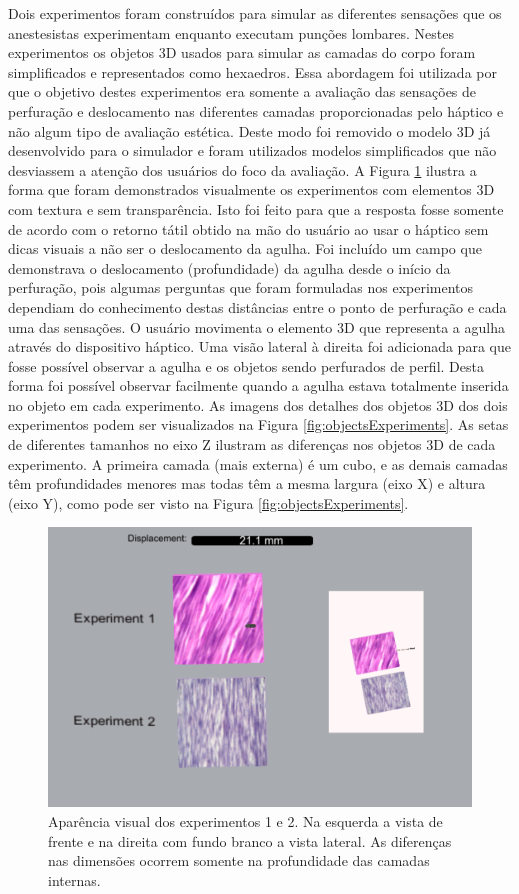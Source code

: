 Dois experimentos foram construídos para simular as diferentes sensações que os anestesistas experimentam enquanto executam punções lombares. Nestes experimentos os objetos 3D usados para simular as camadas do corpo foram simplificados e representados como hexaedros. Essa abordagem foi utilizada por que o objetivo destes experimentos era somente a avaliação das sensações de perfuração e deslocamento nas diferentes camadas proporcionadas pelo háptico e não algum tipo de avaliação estética. Deste modo foi removido o modelo 3D já desenvolvido para o simulador e foram utilizados modelos simplificados que não desviassem a atenção dos usuários do foco da avaliação. 
A Figura \ref{fig:visualExperimentos1e2} ilustra a forma que foram demonstrados visualmente os experimentos com elementos 3D com textura e sem transparência. Isto foi feito para que a resposta fosse somente de acordo com o retorno tátil obtido na mão do usuário ao usar o háptico sem dicas visuais a não ser o deslocamento da agulha. Foi incluído um campo que demonstrava o deslocamento (profundidade) da agulha desde o início da perfuração, pois algumas perguntas que foram formuladas nos experimentos dependiam do conhecimento destas distâncias entre o ponto de perfuração e cada uma das sensações. O usuário movimenta o elemento 3D que representa a agulha através do dispositivo háptico. Uma visão lateral à direita foi adicionada para que fosse possível observar a agulha e os objetos sendo perfurados de perfil. Desta forma foi possível observar facilmente quando a agulha estava totalmente inserida no objeto em cada experimento.
As imagens dos detalhes dos objetos 3D dos dois experimentos podem ser visualizados na Figura \ref{fig:objectsExperiments}. As setas de diferentes tamanhos no eixo Z ilustram as diferenças nos objetos 3D de cada experimento. A primeira camada (mais externa) é um cubo, e as demais camadas têm profundidades menores mas todas têm a mesma largura (eixo X) e altura (eixo Y), como pode ser visto na Figura \ref{fig:objectsExperiments}.

\begin{figure}[ht!]
    \centering
    \includegraphics[width=0.8\linewidth]{capitulos/figuras/visual-experimentos.png} 
    \caption{Aparência visual dos experimentos 1 e 2. Na esquerda a vista de frente e na direita com fundo branco a vista lateral. As diferenças nas dimensões ocorrem somente na profundidade das camadas internas.}
    \label{fig:visualExperimentos1e2}
\end{figure}

